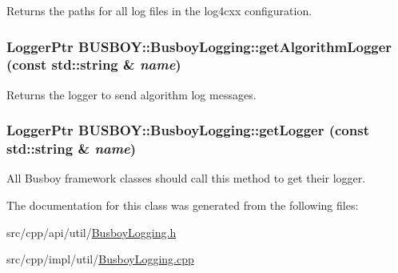 Returns the paths for all log files in the log4cxx configuration. \hypertarget{classBUSBOY_1_1BusboyLogging_a429feabee73838517884e5ba2229ea9f}{
\subsubsection[{getAlgorithmLogger}]{\setlength{\rightskip}{0pt plus 5cm}LoggerPtr BUSBOY::BusboyLogging::getAlgorithmLogger (const std::string \& {\em name})}}
\label{classBUSBOY_1_1BusboyLogging_a429feabee73838517884e5ba2229ea9f}


Returns the logger to send algorithm log messages. \hypertarget{classBUSBOY_1_1BusboyLogging_aafe3f0190e28c0053b23368f93de255b}{
\subsubsection[{getLogger}]{\setlength{\rightskip}{0pt plus 5cm}LoggerPtr BUSBOY::BusboyLogging::getLogger (const std::string \& {\em name})}}
\label{classBUSBOY_1_1BusboyLogging_aafe3f0190e28c0053b23368f93de255b}


All Busboy framework classes should call this method to get their logger. 

The documentation for this class was generated from the following files:\begin{DoxyCompactItemize}
\item 
src/cpp/api/util/\hyperlink{BusboyLogging_8h}{BusboyLogging.h}\item 
src/cpp/impl/util/\hyperlink{BusboyLogging_8cpp}{BusboyLogging.cpp}\end{DoxyCompactItemize}
